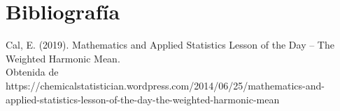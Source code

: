 \documentclass{article}
\begin{document}
    \section{Bibliografía}
    
    

\begin{thebibliography}{9}

Cal, E. (2019). Mathematics and Applied Statistics Lesson of the Day – The Weighted Harmonic Mean.\\ 
Obtenida de https://chemicalstatistician.wordpress.com/2014/06/25/mathematics-and-applied-statistics-lesson-of-the-day-the-weighted-harmonic-mean

\end{thebibliography}
\end{document}
